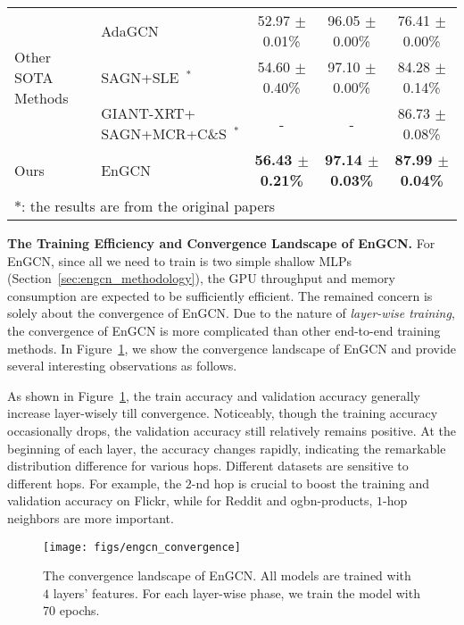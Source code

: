 \message{ !name(main.tex)}\documentclass{article}
\begin{document}
\begin{table}[!ht]
{\begin{tabular}{llccc}
			\midrule
			\multirow{3}{*}{Other SOTA Methods} & AdaGCN~\cite{sun2019adagcn}             & 52.97 \(\pm\) 0.01\%          & 96.05 \(\pm\) 0.00\%          & 76.41 \(\pm\) 0.00\%          \\
			                                    & SAGN+SLE~\cite{sun2021scalable}\(^{*}\) & 54.60 \(\pm\) 0.40\%          & 97.10 \(\pm\) 0.00\%          & 84.28 \(\pm\) 0.14\%          \\
			                                    & \shortstack[l]{GIANT-XRT+                                                                                                               \\SAGN+MCR+C\&S}~\cite{zhang2021improving}\(^{*}\) & - & - & 86.73 \(\pm\) 0.08\% \\
			\midrule
			Ours                                & EnGCN                                   & \textbf{56.43 \(\pm\) 0.21\%} & \textbf{97.14 \(\pm\) 0.03\%} & \textbf{87.99 \(\pm\) 0.04\%} \\
			\bottomrule
			\multicolumn{5}{l}{\small \(*\): the results are from the original papers}
		\end{tabular}}
	\label{tab:comparison_results}
\end{table}

\textbf{The Training Efficiency and Convergence Landscape of EnGCN.}
For EnGCN, since all we need to train is two simple shallow MLPs (Section~\ref{sec:engcn_methodology}), the GPU throughput and memory consumption are expected to be sufficiently efficient. The remained concern is solely about the convergence of EnGCN. Due to the nature of \textit{layer-wise training}, the convergence of EnGCN is more complicated than other end-to-end training methods. In Figure~\ref{fig:engcn_convergence}, we show the convergence landscape of EnGCN and provide several interesting observations as follows.

 As shown in Figure~\ref{fig:engcn_convergence}, the train accuracy and validation accuracy generally increase layer-wisely till convergence. Noticeably, though the training accuracy occasionally drops, the validation accuracy still relatively remains positive.  At the beginning of each layer, the accuracy changes rapidly, indicating the remarkable distribution difference for various hops.  Different datasets are sensitive to different hops. For example, the \(2\)-nd hop is crucial to boost the training and validation accuracy on Flickr, while for Reddit and ogbn-products, \(1\)-hop neighbors are more important.
\begin{figure}[!ht]
	\centering
	\texttt{[image: figs/engcn\_convergence]}
	\caption{The convergence landscape of EnGCN. All models are trained with \(4\) layers' features. For each layer-wise phase, we train the model with 70 epochs.}
	\label{fig:engcn_convergence}
	\vspace{-3mm}
\end{figure}
\end{document}
